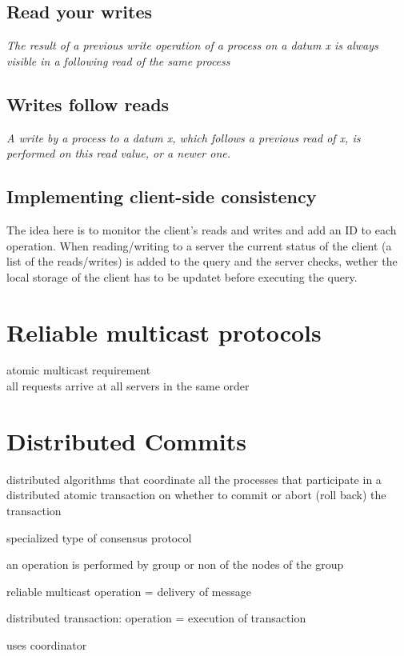 \subsection{Read your writes}
\emph{The result of a previous write operation of a process on a datum x is always visible in a following read of the same process}

\subsection{Writes follow reads}
\emph{A write by a process to a datum x, which follows a previous read of x, is performed on this read value, or a newer one.}

\subsection{Implementing client-side consistency}
The idea here is to monitor the client's reads and writes and add an ID to each operation. When reading/writing to a server the current status of the client (a list of the reads/writes) is added to the query and the server checks, wether the local storage of the client has to be updatet before executing the query.

\section{Reliable multicast protocols}
\begin{compactitem}
	\item atomic multicast requirement\\
	all requests arrive at all servers in the same order
\end{compactitem}

\section{Distributed Commits}

\begin{compactitem}
	\item distributed algorithms that coordinate all the processes that participate in a distributed atomic transaction on whether to commit or abort (roll back) the transaction
	\item specialized type of consensus protocol
\end{compactitem}

\begin{compactitem}
	\item an operation is performed by group or non of the nodes of the group
	\item reliable multicast operation = delivery of message
	\item distributed transaction: operation = execution of transaction
	\item uses coordinator
\end{compactitem}

